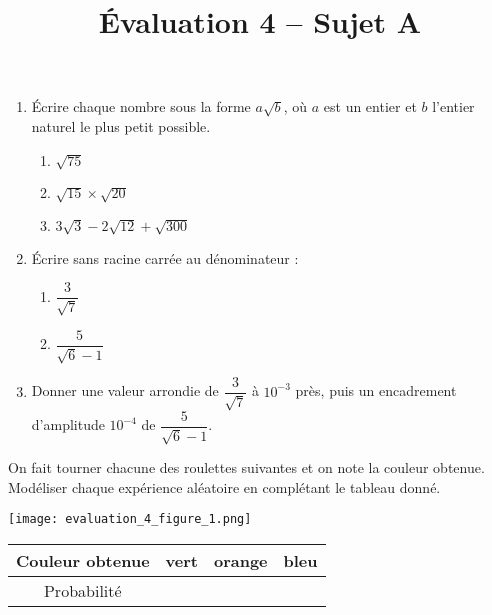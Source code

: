 \documentclass[a4paper,dvipsnames]{article}
\begin{document}
\title{Évaluation 4 -- Sujet A}
\author{}
\date{}

\maketitle{}

\pagestyle{empty}

\exo\vspace{-2mm} 
\begin{enumerate}
  \item Écrire chaque nombre sous la forme $a\sqrt{b}$, où $a$ est un entier et $b$ l'entier naturel le plus petit possible.

    \begin{multicols}{3}
      \begin{enumerate}
	\item $\sqrt{75}$
	\item $\sqrt{15}\times\sqrt{20}$
	\item $3\sqrt{3}-2\sqrt{12}+\sqrt{300}$
      \end{enumerate}
    \end{multicols}
  \item Écrire sans racine carrée au dénominateur :

    \begin{multicols}{2}
      \begin{enumerate}
	\item $\dfrac{3}{\sqrt{7}}$
	\item $\dfrac{5}{\sqrt{6}-1}$
      \end{enumerate} 
    \end{multicols}

  \item Donner une valeur arrondie de $\dfrac{3}{\sqrt{7}}$ à $10^{-3}$ près, puis un encadrement d'amplitude $10^{-4}$ de $\dfrac{5}{\sqrt{6}-1}$.
\end{enumerate}

\bigskip

\exo On fait tourner chacune des roulettes suivantes et on note la couleur obtenue. Modéliser chaque expérience aléatoire en complétant le tableau donné.

\begin{multicols}{2}
  \begin{center}
    \texttt{[image: evaluation\_4\_figure\_1.png]}
  \end{center}

  \begin{center}
    \vspace*{0.7cm}
    \hspace*{-3cm}\begin{tabular}{@{}cccc@{}}
      \toprule
      Couleur obtenue & vert & orange & bleu\\
      \midrule
      Probabilité & & & \vphantom{$\dfrac{1}{4}$}\\
      \bottomrule
    \end{tabular}
  \end{center}
\end{multicols}
\end{document}
